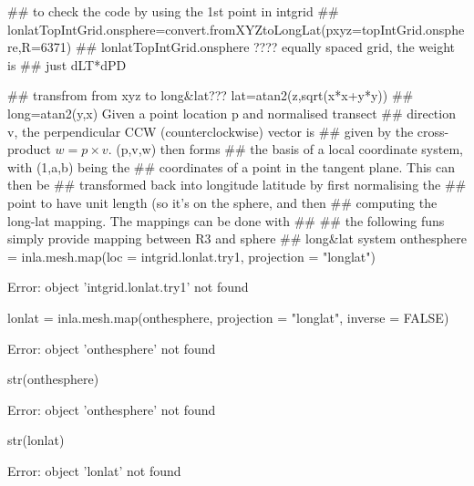\documentclass[a4paper]{article}\usepackage[]{graphicx}\usepackage[]{color}
\begin{document}
\begin{Schunk}
\begin{Sinput}
## to check the code by using the 1st point in intgrid
## lonlatTopIntGrid.onsphere=convert.fromXYZtoLongLat(pxyz=topIntGrid.onsphere,R=6371)
## lonlatTopIntGrid.onsphere ???? equally spaced grid, the weight is
## just dLT*dPD

## transfrom from xyz to long&lat???  lat=atan2(z,sqrt(x*x+y*y))
## long=atan2(y,x) Given a point location p and normalised transect
## direction v, the perpendicular CCW (counterclockwise) vector is
## given by the cross-product $w = p \times v$.  (p,v,w) then forms
## the basis of a local coordinate system, with (1,a,b) being the
## coordinates of a point in the tangent plane.  This can then be
## transformed back into longitude latitude by first normalising the
## point to have unit length (so it's on the sphere, and then
## computing the long-lat mapping.  The mappings can be done with ##
## the following funs simply provide mapping between R3 and sphere
## long&lat system
onthesphere = inla.mesh.map(loc = intgrid.lonlat.try1, projection = "longlat")
\end{Sinput}
\begin{Soutput}
Error: object 'intgrid.lonlat.try1' not found
\end{Soutput}
\begin{Sinput}
lonlat = inla.mesh.map(onthesphere, projection = "longlat", inverse = FALSE)
\end{Sinput}
\begin{Soutput}
Error: object 'onthesphere' not found
\end{Soutput}
\begin{Sinput}
str(onthesphere)
\end{Sinput}
\begin{Soutput}
Error: object 'onthesphere' not found
\end{Soutput}
\begin{Sinput}
str(lonlat)
\end{Sinput}
\begin{Soutput}
Error: object 'lonlat' not found
\end{Soutput}
\end{Schunk}





% 
% 
% 
\end{document}
